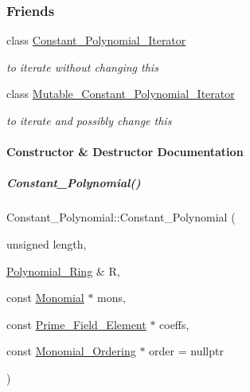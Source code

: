 \subsubsection*{Friends}
\begin{DoxyCompactItemize}
\item 
\mbox{\label{group__polygroup_ab740f854a3b6a761b4deaf1dc3fc4dbf}} 
class \hyperlink{group__polygroup_ab740f854a3b6a761b4deaf1dc3fc4dbf}{Constant\+\_\+\+Polynomial\+\_\+\+Iterator}
\begin{DoxyCompactList}\small\item\em to iterate without changing {\ttfamily this} \end{DoxyCompactList}\item 
\mbox{\label{group__polygroup_aefeb273b3b448966d0c8b5041a420d20}} 
class \hyperlink{group__polygroup_aefeb273b3b448966d0c8b5041a420d20}{Mutable\+\_\+\+Constant\+\_\+\+Polynomial\+\_\+\+Iterator}
\begin{DoxyCompactList}\small\item\em to iterate and possibly change {\ttfamily this} \end{DoxyCompactList}\end{DoxyCompactItemize}


\paragraph{Constructor \& Destructor Documentation}
\mbox{\label{group__polygroup_a17e78adc39df3472a0610b17c906898f}} 
\subparagraph{\texorpdfstring{Constant\+\_\+\+Polynomial()}{Constant\_Polynomial()}\hspace{0.1cm}{\footnotesize\ttfamily [1/3]}}
{\footnotesize\ttfamily Constant\+\_\+\+Polynomial\+::\+Constant\+\_\+\+Polynomial (\begin{DoxyParamCaption}\item[{unsigned}]{length,  }\item[{\hyperlink{group__polygroup_class_polynomial___ring}{Polynomial\+\_\+\+Ring} \&}]{R,  }\item[{const \hyperlink{group__polygroup_class_monomial}{Monomial} $\ast$}]{mons,  }\item[{const \hyperlink{group___fields_group_class_prime___field___element}{Prime\+\_\+\+Field\+\_\+\+Element} $\ast$}]{coeffs,  }\item[{const \hyperlink{group__orderinggroup_class_monomial___ordering}{Monomial\+\_\+\+Ordering} $\ast$}]{order = {\ttfamily nullptr} }\end{DoxyParamCaption})}


